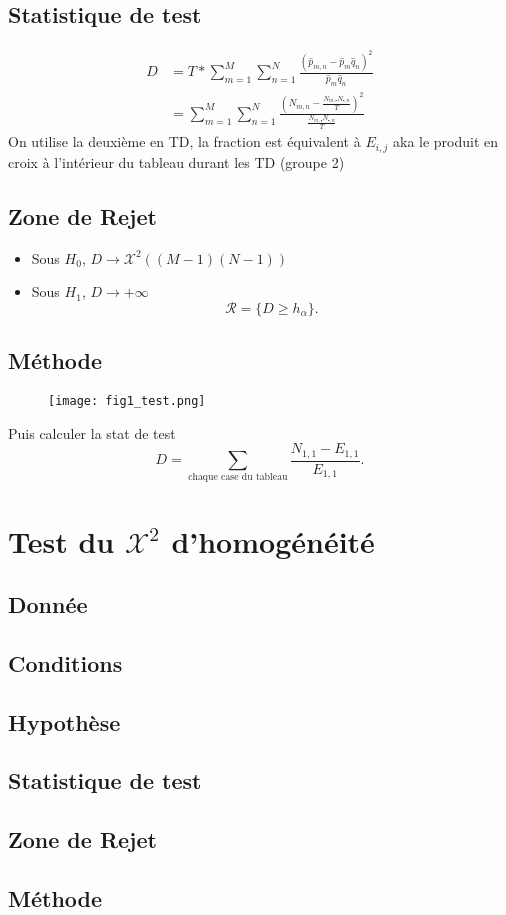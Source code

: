\documentclass{article}
\theoremstyle{plain}%
\theoremstyle{definition}
\theoremstyle{remark}
\begin{document}
\subsection*{Statistique de test}
    \begin{align*}
        D &= T * \sum_{m=1}^{M}\sum_{n=1}^{N}\frac{(\hat{p}_{m,n} - \hat{p}_m \hat{q}_n)^2}{\hat{p}_m \hat{q}_n} \\
            &= \sum_{m=1}^{M}\sum_{n=1}^{N}\frac{( N_{m,n} - \frac{N_{m, \centerdot} N_{\centerdot, n}}{T})^2}{\frac{N_{m, \centerdot} N_{\centerdot, n}}{T}}
    \end{align*}
    On utilise la deuxième en TD, la fraction est équivalent à $ E_{i,j} $ aka le produit en croix à l'intérieur du tableau durant les TD (groupe 2)

\subsection*{Zone de Rejet}
\begin{itemize}
    \item Sous $ H_0 $, $ D \to \mathcal{X}^2 ((M-1)(N-1))  $
    \item Sous $ H_1 $, $ D \to +\infty  $
    \[
        \mathcal{R} = \{D \geq h_\alpha \}
    .\]
\end{itemize}

\subsection*{Méthode}
\begin{figure}[!h]
    \centering
    \texttt{[image: fig1\_test.png]}
\end{figure}
Puis calculer la stat de test 
\[
    D = \sum_{\text{chaque case du tableau}}\frac{N_{1,1}- E_{1,1}}{E_{1,1}}
.\]


\section{Test du $ \mathcal{X}^2 $ d'homogénéité}
\subsection*{Donnée}
\subsection*{Conditions}
\subsection*{Hypothèse}
\subsection*{Statistique de test}
\subsection*{Zone de Rejet}
\subsection*{Méthode}
\end{document}
